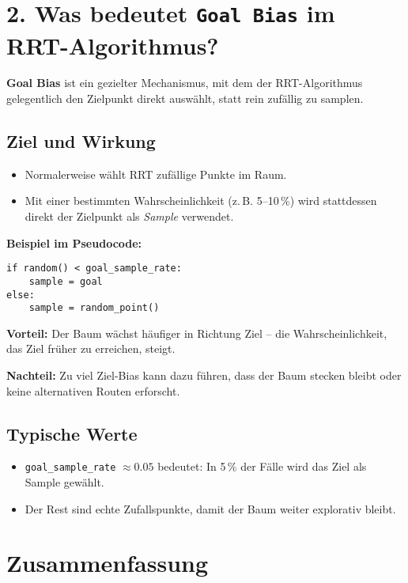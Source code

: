 \documentclass[12pt]{article}
\begin{document}
\section*{2. Was bedeutet \texttt{Goal Bias} im RRT-Algorithmus?}

\textbf{Goal Bias} ist ein gezielter Mechanismus, mit dem der RRT-Algorithmus gelegentlich den Zielpunkt direkt auswählt, statt rein zufällig zu samplen.

\subsection*{Ziel und Wirkung}

\begin{itemize}
    \item Normalerweise wählt RRT zufällige Punkte im Raum.
    \item Mit einer bestimmten Wahrscheinlichkeit (z.\,B. 5--10\,\%) wird stattdessen direkt der Zielpunkt als \emph{Sample} verwendet.
\end{itemize}

\noindent
\textbf{Beispiel im Pseudocode:}
\begin{verbatim}
if random() < goal_sample_rate:
    sample = goal
else:
    sample = random_point()
\end{verbatim}

\noindent
\textbf{Vorteil:} Der Baum wächst häufiger in Richtung Ziel – die Wahrscheinlichkeit, das Ziel früher zu erreichen, steigt.

\noindent
\textbf{Nachteil:} Zu viel Ziel-Bias kann dazu führen, dass der Baum stecken bleibt oder keine alternativen Routen erforscht.

\subsection*{Typische Werte}
\begin{itemize}
    \item \texttt{goal\_sample\_rate} $\approx 0.05$ bedeutet: In 5\,\% der Fälle wird das Ziel als Sample gewählt.
    \item Der Rest sind echte Zufallspunkte, damit der Baum weiter explorativ bleibt.
\end{itemize}

\section*{Zusammenfassung}
\end{document}
